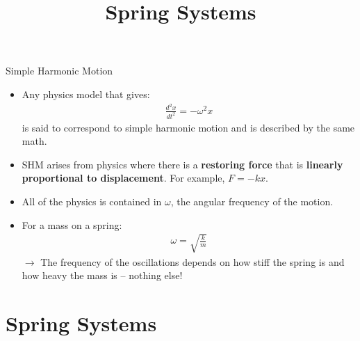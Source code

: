 \documentclass[aspectratio=169,
hyperref={colorlinks,urlcolor=blue}
]{beamer}
\begin{document}
\begin{frame}{Simple Harmonic Motion}
\begin{itemize}
\item Any physics model that gives:
\begin{align*}
\frac{d^2x}{dt^2}=-\omega^2 x
\end{align*}
is said to correspond to simple harmonic motion and is described by the same math. 
\item SHM arises from physics where there is a \textbf{restoring force} that is \textbf{linearly proportional to displacement}. For example, $F=-kx$.
\item All of the physics is contained in $\omega$, the angular frequency of the motion. 
\item For a mass on a spring:
\begin{align*}
\omega=\sqrt{\frac{k}{m}}
\end{align*}
$\rightarrow$ The frequency of the oscillations depends on how stiff the spring is and how heavy the mass is – nothing else!

\end{itemize}

\end{frame}









\section{Spring Systems}
\label{sec:springs}
\title{Spring Systems}
\author{\insertsubsection}


\begin{frame}
\titlepage
\thispagestyle{empty}
\end{frame}

\end{document}
